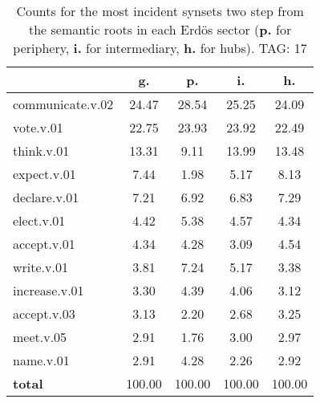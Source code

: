 \begin{table}[h!]
\begin{center}
\begin{tabular}{| l || c | c | c | c |}\hline
 & {\bf g.} & {\bf p.} & {\bf i.} & {\bf h.} \\\hline\hline
communicate.v.02 & 24.47  & 28.54  & 25.25  & 24.09 \\\hline
vote.v.01 & 22.75  & 23.93  & 23.92  & 22.49 \\\hline
think.v.01 & 13.31  & 9.11  & 13.99  & 13.48 \\\hline
expect.v.01 & 7.44  & 1.98  & 5.17  & 8.13 \\\hline
declare.v.01 & 7.21  & 6.92  & 6.83  & 7.29 \\\hline
elect.v.01 & 4.42  & 5.38  & 4.57  & 4.34 \\\hline
accept.v.01 & 4.34  & 4.28  & 3.09  & 4.54 \\\hline
write.v.01 & 3.81  & 7.24  & 5.17  & 3.38 \\\hline
increase.v.01 & 3.30  & 4.39  & 4.06  & 3.12 \\\hline
accept.v.03 & 3.13  & 2.20  & 2.68  & 3.25 \\\hline
meet.v.05 & 2.91  & 1.76  & 3.00  & 2.97 \\\hline
name.v.01 & 2.91  & 4.28  & 2.26  & 2.92 \\\hline\hline
{{\bf total}} & 100.00  & 100.00  & 100.00  & 100.00 \\\hline
\end{tabular}
\caption{Counts for the most incident synsets two step from the semantic roots in each Erd\"os sector ({\bf p.} for periphery, {\bf i.} for intermediary, {\bf h.} for hubs). TAG: 17}
\end{center}
\end{table}